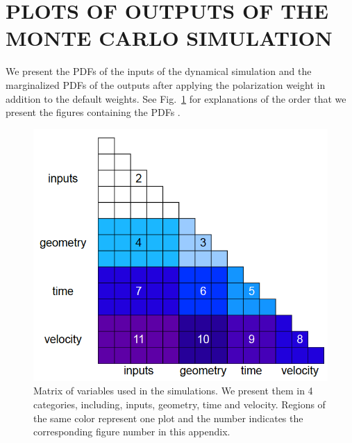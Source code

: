 \documentclass[letterpaper,useAMS,usenatbib]{mn2e}
\begin{document}
\section{PLOTS OF OUTPUTS OF THE MONTE CARLO SIMULATION}
We present the PDFs of the inputs of the dynamical simulation and the
marginalized PDFs of the outputs after applying the polarization weight in
addition to the default weights. See Fig.~\ref{fig:plot_config} for explanations of
the order that we present the figures containing the PDFs . 
\begin{figure}
	\begin{center}
	\includegraphics[width=\linewidth]{ElGordo_plot_config.png}
	\end{center}
	\caption{Matrix of variables used in the simulations. We present them in
	4 categories, including, inputs, geometry, time and velocity. Regions of
	the same color represent one plot and the number
indicates the corresponding figure number in this appendix.
\label{fig:plot_config}
}
\end{figure}
\label{app:results}
\clearpage
\end{document}
